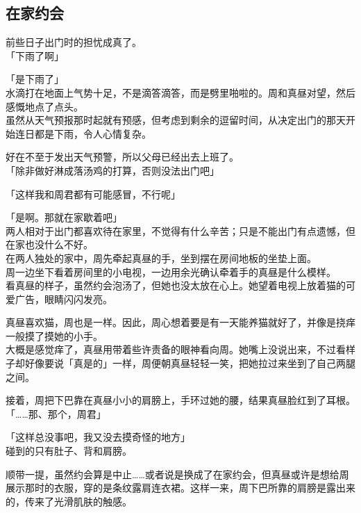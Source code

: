 \subsection{在家约会}

前些日子出门时的担忧成真了。\\

「下雨了啊」

「是下雨了」\\

水滴打在地面上气势十足，不是滴答滴答，而是劈里啪啦的。周和真昼对望，然后感慨地点了点头。\\

虽然从天气预报那时起就有预感，但考虑到剩余的逗留时间，从决定出门的那天开始连日都是下雨，令人心情复杂。

好在不至于发出天气预警，所以父母已经出去上班了。\\

「除非做好淋成落汤鸡的打算，否则没法出门吧」

「这样我和周君都有可能感冒，不行呢」

「是啊。那就在家歇着吧」\\

两人相对于出门都喜欢待在家里，不觉得有什么辛苦；只是不能出门有点遗憾，但在家也没什么不好。\\

在两人独处的家中，周先牵起真昼的手，坐到摆在房间地板的坐垫上面。\\

周一边坐下看着房间里的小电视，一边用余光确认牵着手的真昼是什么模样。\\

看真昼的样子，虽然约会泡汤了，但她也没太放在心上。她望着电视上放着猫的可爱广告，眼睛闪闪发亮。

真昼喜欢猫，周也是一样。因此，周心想着要是有一天能养猫就好了，并像是挠痒一般摸了摸她的小手。\\

大概是感觉痒了，真昼用带着些许责备的眼神看向周。她嘴上没说出来，不过看样子却好像要说「真是的」一样，周便朝真昼轻轻一笑，把她拉过来坐到了自己两腿之间。

接着，周把下巴靠在真昼小小的肩膀上，手环过她的腰，结果真昼脸红到了耳根。\\

「……那、那个，周君」

「这样总没事吧，我又没去摸奇怪的地方」\\

碰到的只有肚子、背和肩膀。

顺带一提，虽然约会算是中止……或者说是换成了在家约会，但真昼或许是想给周展示那时的衣服，穿的是条纹露肩连衣裙。这样一来，周下巴所靠的肩膀是露出来的，传来了光滑肌肤的触感。\\

